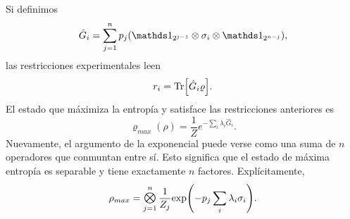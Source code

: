 Si definimos
\begin{equation}\label{eq:GhatNM}
    \hat{G}_{i}=\sum_{j=1}^{n}p_{j}(\Id_{2^{j-1}}\otimes\sigma_{i}\otimes\Id_{2^{n-j}}),
\end{equation}
las restricciones experimentales leen
\begin{equation}\label{eq:MaxEntRestrictionsNM}
    r_{i}=\Tr[\hat{G}_{i}\varrho].
\end{equation}
El estado que máximiza la entropía y satisface las restricciones anteriores es
\begin{equation}\label{eq:MaxEntLagMultNM}
    \varrho_{max}(\rho)=\frac{1}{Z}e^{-\sum_{i}\lambda_{i}\hat{G}_{i}}.
\end{equation}
Nuevamente, el argumento de la exponencial puede verse como una suma de $n$ operadores que conmuntan entre sí. Esto significa que el estado de máxima entropía es separable y tiene exactamente $n$ factores. Explícitamente,
\begin{equation}\label{eq:GeneralMaxEnt}
    \rho_{max}=\Motimes_{j=1}^{n}\frac{1}{Z_{j}}\text{exp}\qty(-p_{j}\sum_{i}\lambda_{i}\sigma_{i}).
\end{equation}